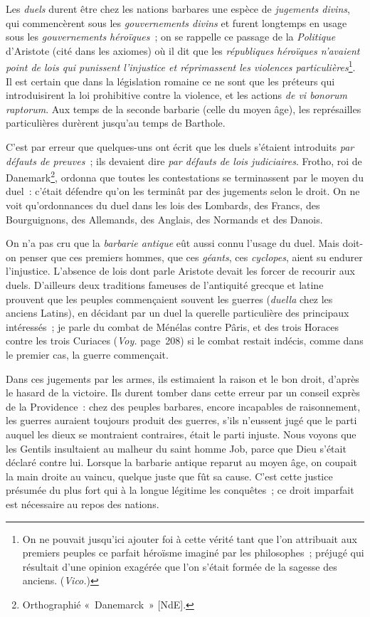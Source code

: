 \documentclass[french,twoside]{book} %
\begin{document}
Les {\itshape duels} durent être chez les nations barbares une espèce de {\itshape jugements divins}, qui commencèrent sous les {\itshape gouvernements divins} et furent longtemps en usage sous les {\itshape gouvernements héroïques} ; on se rappelle ce passage de la {\itshape Politique} d’Aristote (cité dans les axiomes) où il dit que les \emph{{\itshape républiques héroïques n’avaient point de lois qui punissent l’injustice et réprimassent les violences particulières}}\footnote{On ne pouvait jusqu’ici ajouter foi à cette vérité tant que l’on attribuait aux premiers peuples ce parfait héroïsme imaginé par les philosophes ; préjugé qui résultait d’une opinion exagérée que l’on s’était formée de la sagesse des anciens. ({\itshape Vico.})}. Il est certain que dans la législation romaine ce ne sont que les préteurs qui introduisirent la loi prohibitive contre la violence, et les actions {\itshape de vi bonorum raptorum}. Aux temps de la seconde barbarie (celle du moyen âge), les représailles particulières durèrent jusqu’au temps de Barthole.\par
C’est par erreur que quelques-uns ont écrit que les duels s’étaient introduits {\itshape par défauts de preuves} ; ils devaient dire {\itshape par défauts de lois judiciaires}. Frotho, roi de Danemark\footnote{Orthographié « Danemarck » [NdE].}, ordonna que toutes les contestations se terminassent par le moyen du duel : c’était défendre qu’on les terminât par des jugements selon le droit. On ne voit qu’ordonnances du duel dans les lois des Lombards, des Francs, des Bourguignons,  des Allemands, des Anglais, des Normands et des Danois.\par
On n’a pas cru que la {\itshape barbarie antique} eût aussi connu l’usage du duel. Mais doit-on penser que ces premiers hommes, que ces {\itshape géants}, ces {\itshape cyclopes}, aient su endurer l’injustice. L’absence de lois dont parle Aristote devait les forcer de recourir aux duels. D’ailleurs deux traditions fameuses de l’antiquité grecque et latine prouvent que les peuples commençaient souvent les guerres ({\itshape duella} chez les anciens Latins), en décidant par un duel la querelle particulière des principaux intéressés ; je parle du combat de Ménélas contre Pâris, et des trois Horaces contre les trois Curiaces ({\itshape Voy.} page 208) si le combat restait indécis, comme dans le premier cas, la guerre commençait.\par
Dans ces jugements par les armes, ils estimaient la raison et le bon droit, d’après le hasard de la victoire. Ils durent tomber dans cette erreur par un conseil exprès de la Providence : chez des peuples barbares, encore incapables de raisonnement, les guerres auraient toujours produit des guerres, s’ils n’eussent jugé que le parti auquel les dieux se montraient contraires, était le parti injuste. Nous voyons que les Gentils insultaient au malheur du saint homme Job, parce que Dieu s’était déclaré contre lui. Lorsque la barbarie antique reparut au moyen âge, on coupait la main droite au vaincu, quelque juste que fût sa cause. C’est cette justice présumée du plus fort qui à la longue légitime les conquêtes ;  ce droit imparfait est nécessaire au repos des nations.\par
\end{document}
